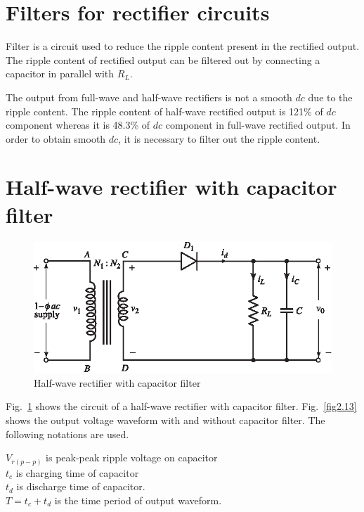 \section{Filters for rectifier circuits}\label{sec2.18}

Filter is a circuit  used to reduce the ripple content present in the
rectified output. The ripple content of rectified output can be
filtered out by connecting a capacitor in parallel with $R_L$.

The output from full-wave and half-wave rectifiers is not a smooth
$dc$ due to the ripple content. The ripple content of half-wave
rectified output is 121\% of $dc$ component whereas it is 48.3\% of
$dc$ component in full-wave rectified output. In order to obtain
smooth $dc$, it is  necessary to filter out the ripple content.

\section{Half-wave rectifier with capacitor filter}\label{sec2.19}
\begin{figure}[H]
\centering
\includegraphics{chap2/add-fig/S3-EE-02-012.eps}
\caption{Half-wave rectifier with capacitor filter}\label{fig2.12}
\end{figure}

Fig.~\ref{fig2.12} shows the circuit of a half-wave rectifier with capacitor
filter. Fig.~\ref{fig2.13} shows the output voltage waveform with and without
capacitor filter. The following notations are used.
\begin{tabbing}
$V_{r(p-p)}$ is peak-peak ripple voltage on capacitor\\[3pt]
$t_c$ is charging time of capacitor\\[3pt]
$t_d$ is discharge time of capacitor.\\[3pt]
$T = t_c + t_d$ is the time period of output waveform.
\end{tabbing}


